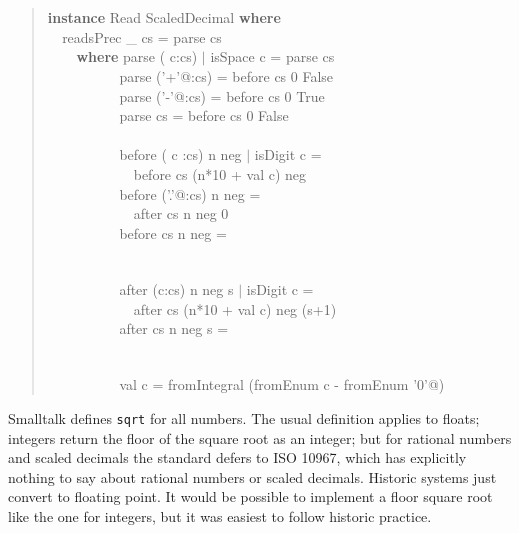 \documentclass[prodmode,acmtoplas]{acmsmall}
\begin{document}
\begin{quote}
\begin{tabbing}
\sffamily \textbf{instance} Read ScaledDecimal \textbf{where}\\
\verb|  |\sffamily  readsPrec \_ cs = parse cs\\
\verb|    |\sffamily    \textbf{where} parse ( c:cs) $|$ isSpace c = parse cs\\
\verb|          |\sffamily          parse (\verb@'+'@:cs) = before cs 0 False\\
\verb|          |\sffamily          parse (\verb@'-'@:cs) = before cs 0 True\\
\verb|          |\sffamily          parse      cs  = before cs 0 False\\
\\
\verb|          |\sffamily          before ( c :cs) n neg $|$ isDigit c =\\
\verb|            |\sffamily            before cs (n*10 + val c) neg\\
\verb|          |\sffamily          before (\verb@'.'@:cs) n neg =\\
\verb|            |\sffamily            after cs n neg 0\\
\verb|          |\sffamily          before      cs  n neg =\\
{}\verb|            |\\
\\
\verb|          |\sffamily          after (c:cs) n neg s $|$ isDigit c =\\
\verb|            |\sffamily            after cs (n*10 + val c) neg (s+1)\\
\verb|          |\sffamily          after cs     n neg s =\\
{}\verb|            |\\
\\
\verb|          |\sffamily          val c = fromIntegral (fromEnum c - fromEnum \verb@'0'@)
\end{tabbing}
\end{quote}

Smalltalk defines \verb|sqrt| for all numbers.  The usual definition
applies to floats; integers return the floor of the square root as an
integer; but for rational numbers and scaled decimals the standard
defers to ISO 10967, which has explicitly nothing to say about rational
numbers or scaled decimals.  Historic systems just convert to floating
point.  It would be possible to implement a floor square root like the
one for integers, but it was easiest to follow historic practice.
\end{document}
